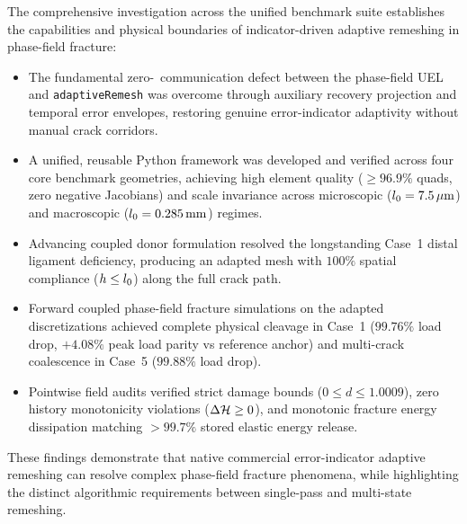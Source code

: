 The comprehensive investigation across the unified benchmark suite establishes the capabilities and physical boundaries of indicator-driven adaptive remeshing in phase-field fracture:
\begin{itemize}
  \item The fundamental zero-\MISESERI\ communication defect between the phase-field UEL and \Abaqus \texttt{adaptiveRemesh} was overcome through auxiliary recovery projection and temporal error envelopes, restoring genuine error-indicator adaptivity without manual crack corridors.
  \item A unified, reusable Python framework was developed and verified across four core benchmark geometries, achieving high element quality ($\ge 96.9\%$ quads, zero negative Jacobians) and scale invariance across microscopic ($l_0 = 7.5\,\mu\mathrm{m}$) and macroscopic ($l_0 = 0.285\,\mathrm{mm}$) regimes.
  \item Advancing coupled donor formulation resolved the longstanding Case~1 distal ligament deficiency, producing an adapted mesh with $100\%$ spatial compliance ($h \le l_0$) along the full crack path.
  \item Forward coupled phase-field fracture simulations on the adapted discretizations achieved complete physical cleavage in Case~1 ($99.76\%$ load drop, $+4.08\%$ peak load parity vs reference anchor) and multi-crack coalescence in Case~5 ($99.88\%$ load drop).
  \item Pointwise field audits verified strict damage bounds ($0 \le d \le 1.0009$), zero history monotonicity violations ($\Delta \mathcal{H} \ge 0$), and monotonic fracture energy dissipation matching $>99.7\%$ stored elastic energy release.
\end{itemize}
These findings demonstrate that native commercial error-indicator adaptive remeshing can resolve complex phase-field fracture phenomena, while highlighting the distinct algorithmic requirements between single-pass and multi-state remeshing.